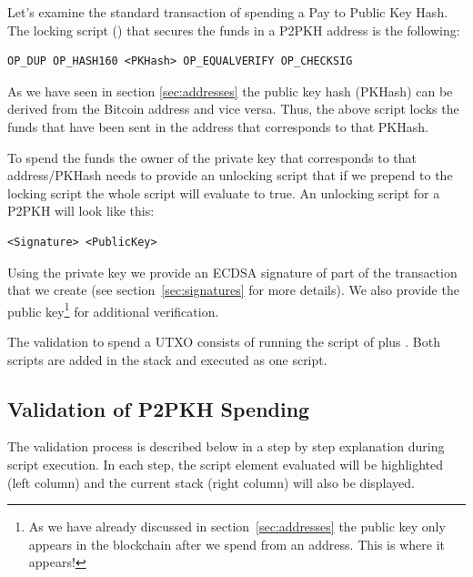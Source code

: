 Let’s examine the standard transaction of spending a Pay to Public Key Hash. The locking script () that secures the funds in a P2PKH address is the following:

\begin{emphbox}
\begin{verbatim}
OP_DUP OP_HASH160 <PKHash> OP_EQUALVERIFY OP_CHECKSIG
\end{verbatim}
\end{emphbox}

As we have seen in section \ref{sec:addresses} the public key hash (PKHash) can be derived from the Bitcoin address and vice versa. Thus, the above script locks the funds that have been sent in the address that corresponds to that PKHash.

To spend the funds the owner of the private key that corresponds to that address/PKHash needs to provide an unlocking script that if we prepend to the locking script the whole script will evaluate to true. An unlocking script for a P2PKH will look like this:

\begin{emphbox}
\begin{verbatim}
<Signature> <PublicKey>
\end{verbatim}
\end{emphbox}

Using the private key we provide an ECDSA signature of part of the transaction that we create (see section~\ref{sec:signatures} for more details). We also provide the public key\footnote{As we have already discussed in section~\ref{sec:addresses} the public key only appears in the blockchain after we spend from an address. This is where it appears!} for additional verification.

The validation to spend a UTXO consists of running the script of  plus . Both scripts are added in the stack and executed as one script.

\subsection*{Validation of P2PKH Spending}
The validation process is described below in a step by step explanation during script execution. In each step, the script element evaluated will be highlighted (left column) and the current stack (right column) will also be displayed.

